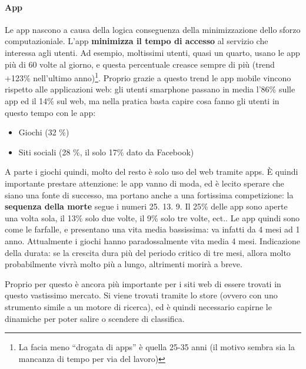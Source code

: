 \paragraph*{App}Le app nascono a causa della logica conseguenza della minimizzazione dello sforzo computazioniale. L'app \textbf{minimizza il tempo di accesso} al servizio che interessa agli utenti. Ad esempio, moltissimi utenti, quasi un quarto, usano le app pi\`u di 60 volte al giorno, e questa percentuale creasce sempre di pi\`u (trend +123\% nell'ultimo anno)\footnote{La facia meno ``drogata di apps'' \`e quella 25-35 anni (il motivo sembra sia la mancanza di tempo per via del lavoro)}. Proprio grazie a questo trend le app mobile vincono rispetto alle applicazioni web: gli utenti smarphone passano in media l'86\% sulle app ed il 14\% sul web, ma nella pratica basta capire cosa fanno gli utenti in questo tempo con le app:
\begin{itemize}

\item Giochi (32 \%)
\item Siti sociali (28 \%, il solo 17\% dato da Facebook)
  
\end{itemize}
A parte i giochi quindi, molto del resto \`e solo uso del web tramite apps. \`E quindi importante prestare attenzione: le app vanno di moda, ed \`e lecito sperare che siano una fonte di successo, ma portano anche a una fortissima competizione: la \textbf{sequenza della morte} segue i numeri 25. 13. 9. Il 25\% delle app sono aperte una volta sola, il 13\% solo due volte, il 9\% solo tre volte, ect..
Le app quindi sono come le farfalle, e presentano una vita media bassissima: va infatti da 4 mesi ad 1 anno. Attualmente i giochi hanno paradossalmente vita media 4 mesi. Indicazione della durata: se la crescita dura pi\`u del periodo critico di tre mesi, allora molto probabilmente vivr\`a molto pi\`u a lungo, altrimenti morir\`a a breve.

Proprio per questo \`e ancora pi\`u importante per i siti web di essere trovati in questo vastissimo mercato. Si viene trovati tramite lo store (ovvero con uno strumento simile a un motore di ricerca), ed \`e quindi necessario capirne le dinamiche per poter salire o scendere di classifica.

